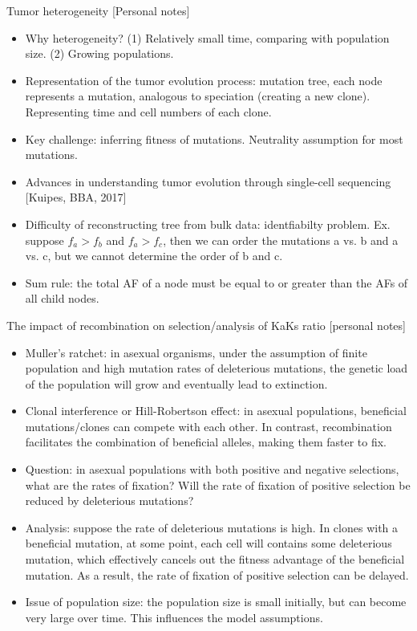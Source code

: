 \documentclass{report}
\begin{document}
Tumor heterogeneity [Personal notes]
\begin{itemize}
	\item Why heterogeneity? (1) Relatively small time, comparing with population size. (2) Growing populations.
	
	\item Representation of the tumor evolution process: mutation tree, each node represents a mutation, analogous to speciation (creating a new clone). Representing time and cell numbers of each clone.
	
	\item Key challenge: inferring fitness of mutations. Neutrality assumption for most mutations.
	
	\item Advances in understanding tumor evolution through single-cell sequencing [Kuipes, BBA, 2017]
	
	\item Difficulty of reconstructing tree from bulk data: identfiabilty problem. Ex. suppose $f_a > f_b$ and $f_a > f_c$, then we can order the mutations a vs. b and a vs. c, but we cannot determine the order of b and c.
	
	\item Sum rule: the total AF of a node must be equal to or greater than the AFs of all child nodes.
\end{itemize}

The impact of recombination on selection/analysis of KaKs ratio [personal notes]
\begin{itemize}
	\item Muller’s ratchet: in asexual organisms, under the assumption of finite population and high mutation rates of deleterious mutations, the genetic load of the population will grow and eventually lead to extinction. 
	
	\item Clonal interference or Hill-Robertson effect: in asexual populations, beneficial mutations/clones can compete with each other. In contrast, recombination facilitates the combination of beneficial alleles, making them faster to fix. 
	
	\item Question: in asexual populations with both positive and negative selections, what are the rates of fixation? Will the rate of fixation of positive selection be reduced by deleterious mutations? 
	
	\item Analysis: suppose the rate of deleterious mutations is high. In clones with a beneficial mutation, at some point, each cell will contains some deleterious mutation, which effectively cancels out the fitness advantage of the beneficial mutation. As a result, the rate of fixation of positive selection can be delayed. 
	
	\item Issue of population size: the population size is small initially, but can become very large over time. This influences the model assumptions. 
\end{itemize}
\end{document}
